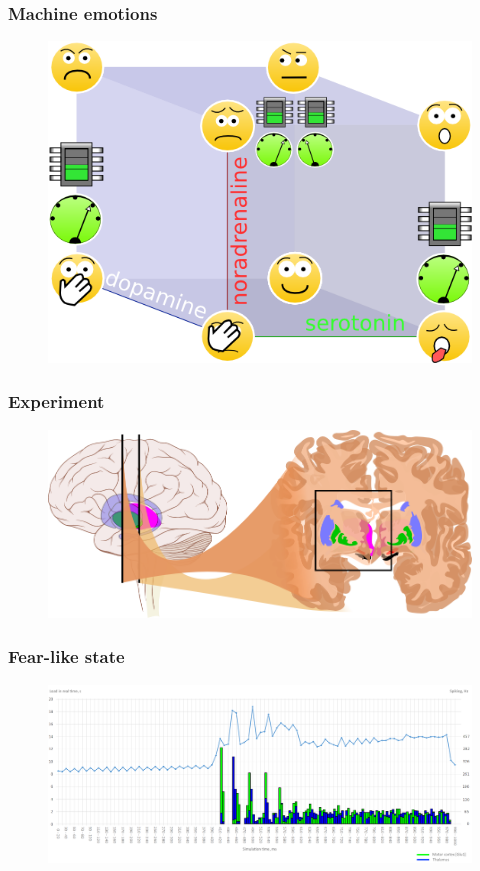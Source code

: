 \documentclass[12pt, aspectratio=169]{beamer}
\begin{document}


\begin{frame}
\frametitle{Machine emotions}
\begin{figure}
\includegraphics[width=0.6\linewidth]{cube_of_emotional_parameters_machine}
\end{figure}
\end{frame}



\begin{frame}
\frametitle{Experiment}
\begin{figure}
\includegraphics[width=1.0\linewidth]{Basal_ganglia_circuits_cropped}
\end{figure}
\end{frame}



\begin{frame}
\frametitle{Fear-like state}
\begin{figure}
\includegraphics[width=1.0\textwidth]{resultBIG}
\end{figure}
\end{frame}
\end{document}
